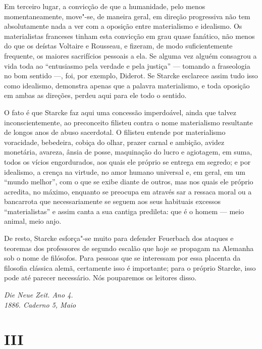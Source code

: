 Em terceiro lugar, a convicção de que a humanidade, pelo menos
momentaneamente, move"-se, de maneira geral, em direção progressiva não
tem absolutamente nada a ver com a oposição entre materialismo e
idealismo. Os materialistas franceses tinham esta convicção em grau
quase fanático, não menos do que os
deístas Voltaire e Rousseau,
e fizeram, de modo suficientemente frequente, os maiores sacrifícios
pessoais a ela. Se alguma vez alguém consagrou a vida toda ao
``entusiasmo pela verdade e pela justiça'' --- tomando a fraseologia no
bom sentido ---, foi, por
exemplo, Diderot. Se Starcke esclarece
assim tudo isso como idealismo, demonstra apenas que a palavra
materialismo, e toda oposição em ambas as direções, perdeu aqui para ele
todo o sentido.

O fato é que Starcke faz aqui uma concessão imperdoável, ainda que
talvez inconscientemente, ao preconceito filisteu contra o nome
materialismo resultante de longos anos de abuso sacerdotal. O filisteu
entende por materialismo voracidade, bebedeira, cobiça do olhar, prazer
carnal e ambição, avidez monetária, avareza, ânsia de posse, maquinação
do lucro e agiotagem, em suma, todos os vícios engordurados, aos quais
ele próprio se entrega em segredo; e por idealismo, a crença na virtude,
no amor humano universal e, em geral, em um ``mundo melhor'', com o que
se exibe diante de outros, mas nos quais ele próprio acredita, no
máximo, enquanto se preocupa em através sar a ressaca moral 
ou a bancarrota que necessariamente se seguem aos
seus habituais excessos ``materialistas'' e assim canta a sua cantiga
predileta: que é o homem --- meio animal, meio anjo.

De resto, Starcke esforça"-se muito para
defender Feuerbach dos
ataques e teoremas dos professores de segundo escalão
que hoje se propagam na Alemanha sob o nome de filósofos. Para pessoas
que se interessam por essa placenta da filosofia clássica alemã,
certamente isso é importante; para o próprio Starcke, isso pode até
parecer necessário. Nós pouparemos os leitores disso.

\quebra

\begin{flushright}
\emph{Die Neue Zeit. Ano 4.}\\
\emph{1886. Caderno 5, Maio}
\end{flushright}

\vspace{2cm}

\section{III}


